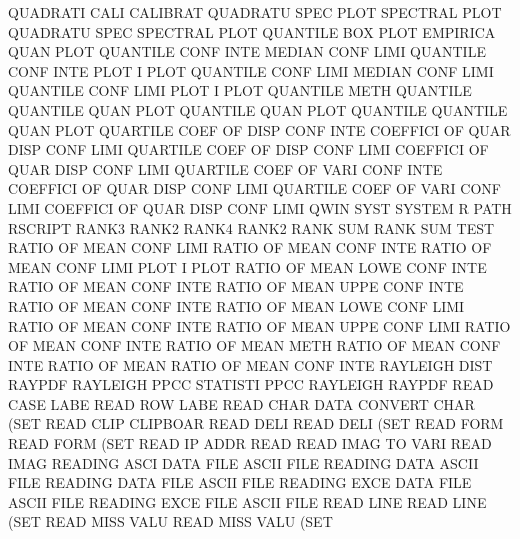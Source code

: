 QUADRATI CALI                           CALIBRAT
QUADRATU SPEC PLOT                      SPECTRAL PLOT
QUADRATU SPEC                           SPECTRAL PLOT
QUANTILE BOX  PLOT                      EMPIRICA QUAN PLOT
QUANTILE CONF INTE                      MEDIAN   CONF LIMI
QUANTILE CONF INTE PLOT                 I        PLOT
QUANTILE CONF LIMI                      MEDIAN   CONF LIMI
QUANTILE CONF LIMI PLOT                 I        PLOT
QUANTILE METH                           QUANTILE
QUANTILE QUAN PLOT                      QUANTILE QUAN PLOT
QUANTILE                                QUANTILE QUAN PLOT
QUARTILE COEF OF   DISP CONF INTE       COEFFICI OF   QUAR DISP CONF LIMI
QUARTILE COEF OF   DISP CONF LIMI       COEFFICI OF   QUAR DISP CONF LIMI
QUARTILE COEF OF   VARI CONF INTE       COEFFICI OF   QUAR DISP CONF LIMI
QUARTILE COEF OF   VARI CONF LIMI       COEFFICI OF   QUAR DISP CONF LIMI
QWIN     SYST                           SYSTEM
R        PATH                           RSCRIPT
RANK3                                   RANK2
RANK4                                   RANK2
RANK     SUM                            RANK     SUM  TEST
RATIO    OF   MEAN CONF LIMI            RATIO    OF   MEAN CONF INTE
RATIO    OF   MEAN CONF LIMI PLOT       I        PLOT
RATIO    OF   MEAN LOWE CONF INTE       RATIO    OF   MEAN CONF INTE
RATIO    OF   MEAN UPPE CONF INTE       RATIO    OF   MEAN CONF INTE
RATIO    OF   MEAN LOWE CONF LIMI       RATIO    OF   MEAN CONF INTE
RATIO    OF   MEAN UPPE CONF LIMI       RATIO    OF   MEAN CONF INTE
RATIO    OF   MEAN METH                 RATIO    OF   MEAN CONF INTE
RATIO    OF   MEAN                      RATIO    OF   MEAN CONF INTE
RAYLEIGH DIST                           RAYPDF
RAYLEIGH PPCC                           STATISTI PPCC
RAYLEIGH                                RAYPDF
READ     CASE LABE                      READ     ROW  LABE
READ     CHAR DATA                      CONVERT  CHAR (SET
READ     CLIP                           CLIPBOAR
READ     DELI                           READ     DELI (SET
READ     FORM                           READ     FORM (SET
READ     IP   ADDR                      READ
READ     IMAG TO   VARI                 READ     IMAG
READING  ASCI DATA FILE                 ASCII    FILE
READING  DATA                           ASCII    FILE
READING  DATA FILE                      ASCII    FILE
READING  EXCE DATA FILE                 ASCII    FILE
READING  EXCE FILE                      ASCII    FILE
READ     LINE                           READ     LINE (SET
READ     MISS VALU                      READ     MISS VALU (SET
